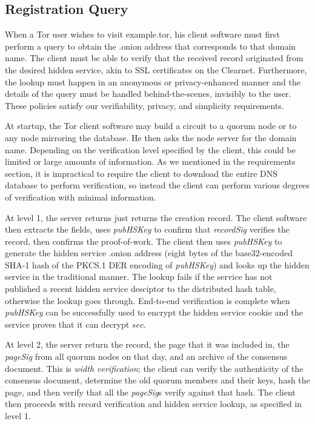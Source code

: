 \subsection{Registration Query}

When a Tor user wishes to visit example.tor, his client software must first perform a query to obtain the .onion address that corresponds to that domain name. The client must be able to verify that the received record originated from the desired hidden service, akin to SSL certificates on the Clearnet. Furthermore, the lookup must happen in an anonymous or privacy-enhanced manner and the details of the query must be handled behind-the-scenes, invisibly to the user. These policies satisfy our verifiability, privacy, and simplicity requirements.

At startup, the Tor client software may build a circuit to a quorum node or to any node mirroring the database. He then asks the node server for the domain name. Depending on the verification level specified by the client, this could be limited or large amounts of information. As we mentioned in the requirements section, it is impractical to require the client to download the entire DNS database to perform verification, so instead the client can perform various degrees of verification with minimal information.

At level 1, the server returns just returns the creation record. The client software then extracts the fields, uses \textit{pubHSKey} to confirm that \textit{recordSig} verifies the record, then confirms the proof-of-work. The client then uses \textit{pubHSKey} to generate the hidden service .onion address (eight bytes of the base32-encoded SHA-1 hash of the PKCS.1 DER encoding of \textit{pubHSKey}) and looks up the hidden service in the traditional manner. The lookup fails if the service has not published a recent hidden service desciptor to the distributed hash table, otherwise the lookup goes through. End-to-end verification is complete when \textit{pubHSKey} can be successfully used to encrypt the hidden service cookie and the service proves that it can decrypt $ sec $.

At level 2, the server return the record, the page that it was included in, the \textit{pageSig} from all quorum nodes on that day, and an archive of the consensus document. This is \textit{width verification}; the client can verify the authenticity of the consensus document, determine the old quorum members and their keys, hash the page, and then verify that all the \textit{pageSig}s verify against that hash. The client then proceeds with record verification and hidden service lookup, as specified in level 1.

